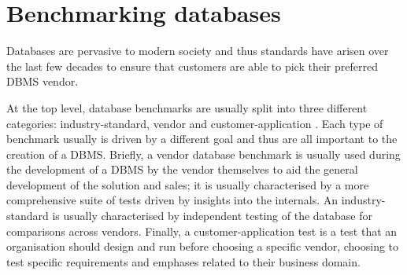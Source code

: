 \section{Benchmarking databases}
Databases are pervasive to modern society and thus standards have arisen over
the last few decades to ensure that customers are able to pick their preferred
DBMS vendor.

At the top level, database benchmarks are usually split into three different
categories: industry-standard, vendor and
customer-application \cite{PractitionersIntroduction}. Each type of benchmark
usually is driven by a different goal and thus are all important to the creation
of a DBMS. Briefly, a vendor database benchmark is usually used during the
development of a DBMS by the vendor themselves to aid
the general development of the solution and sales; it is usually characterised
by a more comprehensive suite of tests driven by insights into the internals. An
industry-standard is usually characterised by independent testing of the
database for comparisons across vendors. Finally, a customer-application test is
a test that an organisation should design and run before choosing a specific
vendor, choosing to test specific requirements and emphases related to their
business domain.
